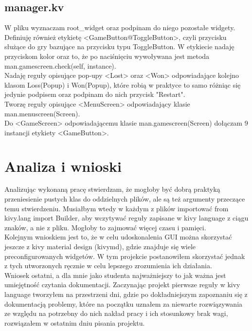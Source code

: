 \documentclass[11pt]{article}
\begin{document}
\subsection{manager.kv}
W pliku wyznaczam root\_widget oraz podpinam do niego pozostałe widgety.\\ Definiuję również etykietę <GameButton@ToggleButton>, czyli przycisku służące do gry bazujące na przycisku typu ToggleButton. W etykiecie nadaję przyciskom kolor oraz to, że po naciśnięciu wywoływana jest metoda man.gamescreen.check(self, instance).\\
Nadaję reguły opisujące pop-upy <Lost> oraz <Won> odpowiadające kolejno klasom Loss(Popup) i Won(Popup), które robią w praktyce to samo różniąc się jedynie podpisem oraz podpinam do nich przycisk "Restart".\\
Tworzę reguły opisujące <MenuScreen> odpowiadający klasie\\ man.menuscreen(Screen).\\
Do <GameScreen> odpowiadającemu klasie man.gamescreen(Screen) dołączam 9 instancji etykiety <GameButton>.
\section{Analiza i wnioski}
Analizując wykonaną pracę stwierdzam, że mogłoby być dobrą praktyką przeniesienie pustych klas do oddzielnych plików, ale są też argumenty przeczące temu stwierdzeniu. Musiałbym wtedy w każdym z plików importować from kivy.lang import Builder, aby wczytywać reguły zapisane w kivy language z ciągu znaków, a nie z pliku. Mogłoby to zajmować więcej czasu i pamięci.\\
Kolejnym wnioskiem jest to, że w celu udoskonalenia GUI można skorzystać jeszcze z kivy material design (kivymd), gdzie znajduje się wiele preconfigurowanych widgetów. W tym projekcie postanowiłem skorzystać jednak z tych utworzonych ręcznie w celu lepszego zrozumienia ich działania.\\
Wniosek ostatni, a dla mnie jako studenta najważniejszy to jak ważna jest umiejętność czytania dokumentacji. Zaczynając projekt pierwsze reguły w kivy language tworzyłem na przestrzeni dni, gdzie po dokładniejszym zapoznaniu się z dokumentacją problemy, które na początku uznałem za niewarte rozwiązywania ze względu na potrzebny do nich nakład pracy i ich stosunkowy brak wagi, rozwiązałem w ostatnim dniu pisania projektu.
\end{document}
